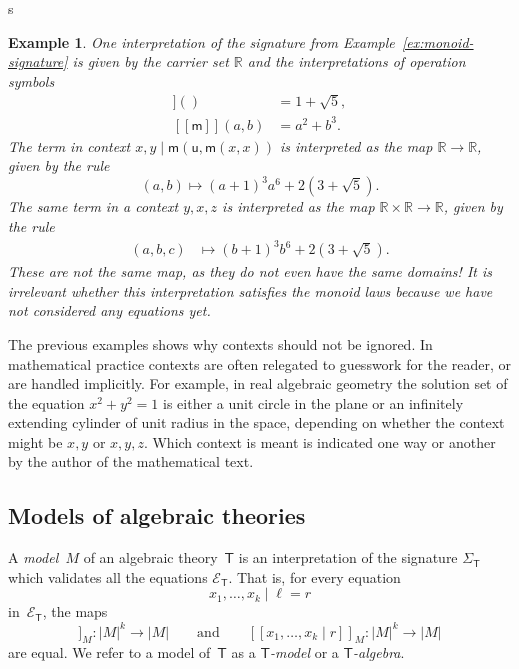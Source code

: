 s\documentclass{amsart}
\newcommand{\RR}{\mathbb{R}} %
\newcommand{\theory}[1]{\mathsf{#1}} %
\newcommand{\signature}[1]{\Sigma_{\theory{#1}}} %
\newcommand{\equations}[1]{\mathcal{E}_{\theory{#1}}} %
\newcommand{\carrier}[1]{|#1|} %
\newcommand{\sem}[1]{[\![#1]\!]} %
\newtheorem{example}[definition]{Example}
\begin{document}
\begin{example}
  One interpretation of the signature from Example~\ref{ex:monoid-signature} is given by
  the carrier set $\RR$ and the interpretations of operation symbols
  \begin{align*}
    \sem{\mathsf{u}}() &= 1 + \sqrt{5}, \\
    \sem{\mathsf{m}}(a, b) &= a^2 + b^3.
  \end{align*}
  The term in context $x, y \mid \mathsf{m}(\mathsf{u}, \mathsf{m}(x, x))$ is interpreted
  as the map $\RR \to \RR$, given by the rule
  \begin{equation*}
    (a, b) \mapsto (a+1)^3 a^6 + 2 (3 + \sqrt{5}).
  \end{equation*}
  The same term in a context $y, x, z$ is interpreted as the map $\RR \times \RR \to \RR$,
  given by the rule
  \begin{align*}
    (a, b, c) &\mapsto (b+1)^3 b^6 + 2 (3 + \sqrt{5}).
  \end{align*}
  These are not the same map, as they do not even have the same domains! It is irrelevant
  whether this interpretation satisfies the monoid laws because we have not considered any
  equations yet.
\end{example}

The previous examples shows why contexts should not be ignored. In mathematical practice
contexts are often relegated to guesswork for the reader, or are handled implicitly. For
example, in real algebraic geometry the solution set of the equation $x^2 + y^2 = 1$ is
either a unit circle in the plane or an infinitely extending cylinder of unit radius in
the space, depending on whether the context might be $x, y$ or $x, y, z$. Which context is
meant is indicated one way or another by the author of the mathematical text.

\subsection{Models of algebraic theories}
\label{sec:models-algebr-theor}

A \emph{model~$M$} of an algebraic theory~$\theory{T}$ is an interpretation of the signature
$\signature{T}$ which validates all the equations $\equations{T}$. That is, for every
equation
%
\begin{equation*}
  x_1, \ldots, x_k \mid \ell = r
\end{equation*}
%
in~$\equations{T}$, the maps
%
\begin{equation*}
  \sem{x_1, \ldots, x_k \mid \ell}_M : \carrier{M}^k \to \carrier{M}
  \qquad\text{and}\qquad
  \sem{x_1, \ldots, x_k \mid r}_M : \carrier{M}^k \to \carrier{M}
\end{equation*}
%
are equal. We refer to a model of~$\theory{T}$ as a \emph{$\theory{T}$-model} or
a \emph{$\theory{T}$-algebra}.
\end{document}
